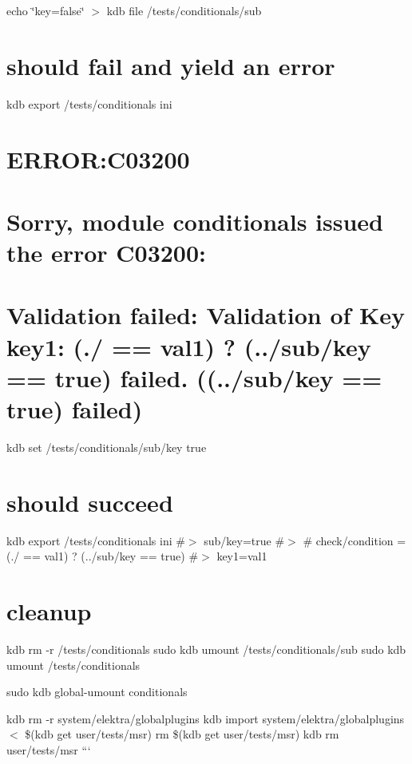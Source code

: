 echo \char`\"{}key=false\char`\"{} $>$ {\ttfamily kdb file /tests/conditionals/sub}\hypertarget{autotoc_md86_autotoc_md98}{}\section{should fail and yield an error}\label{autotoc_md86_autotoc_md98}
kdb export /tests/conditionals ini \hypertarget{autotoc_md86_autotoc_md99}{}\section{E\+R\+R\+O\+R\+:\+C03200}\label{autotoc_md86_autotoc_md99}
\hypertarget{autotoc_md86_autotoc_md100}{}\section{Sorry, module conditionals issued the error C03200\+:}\label{autotoc_md86_autotoc_md100}
\hypertarget{autotoc_md86_autotoc_md101}{}\section{Validation failed\+: Validation of Key key1\+: (./ == \textquotesingle{}val1\textquotesingle{}) ? (../sub/key == \textquotesingle{}true\textquotesingle{}) failed. ((../sub/key == \textquotesingle{}true\textquotesingle{}) failed)}\label{autotoc_md86_autotoc_md101}
kdb set /tests/conditionals/sub/key true\hypertarget{autotoc_md86_autotoc_md102}{}\section{should succeed}\label{autotoc_md86_autotoc_md102}
kdb export /tests/conditionals ini \#$>$ sub/key=true \#$>$ \# check/condition = (./ == \textquotesingle{}val1\textquotesingle{}) ? (../sub/key == \textquotesingle{}true\textquotesingle{}) \#$>$ key1=val1\hypertarget{autotoc_md86_autotoc_md103}{}\section{cleanup}\label{autotoc_md86_autotoc_md103}
kdb rm -\/r /tests/conditionals sudo kdb umount /tests/conditionals/sub sudo kdb umount /tests/conditionals

sudo kdb global-\/umount conditionals

kdb rm -\/r system/elektra/globalplugins kdb import system/elektra/globalplugins $<$ \$(kdb get user/tests/msr) rm \$(kdb get user/tests/msr) kdb rm user/tests/msr ``` 